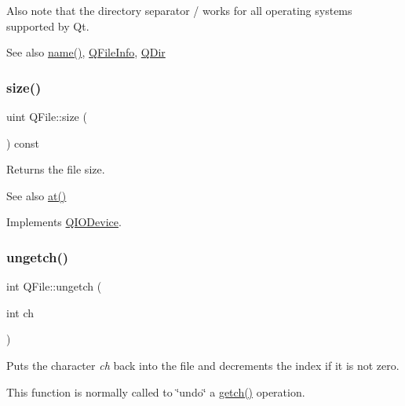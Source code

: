 Also note that the directory separator \textquotesingle{}/\textquotesingle{} works for all operating systems supported by Qt.

\begin{DoxySeeAlso}{See also}
\mbox{\hyperlink{class_q_file_ad14b368c041b9e2d22bbd4428f859b29}{name()}}, \mbox{\hyperlink{class_q_file_info}{Q\+File\+Info}}, \mbox{\hyperlink{class_q_dir}{Q\+Dir}} 
\end{DoxySeeAlso}
\mbox{\label{class_q_file_ae6d2d1ffc423701e6acfc7be48a11e73}} 
\subsubsection{\texorpdfstring{size()}{size()}}
{\footnotesize\ttfamily uint Q\+File\+::size (\begin{DoxyParamCaption}{ }\end{DoxyParamCaption}) const\hspace{0.3cm}{\ttfamily [virtual]}}

Returns the file size. \begin{DoxySeeAlso}{See also}
\mbox{\hyperlink{class_q_file_aa156f3896b35b0c6f6e9cf9237bf34bf}{at()}} 
\end{DoxySeeAlso}


Implements \mbox{\hyperlink{class_q_i_o_device_a60c4146763625213ac7aa29f1f071592}{Q\+I\+O\+Device}}.

\mbox{\label{class_q_file_afb01a04cda09b3cc61babb5d334a052c}} 
\subsubsection{\texorpdfstring{ungetch()}{ungetch()}}
{\footnotesize\ttfamily int Q\+File\+::ungetch (\begin{DoxyParamCaption}\item[{int}]{ch }\end{DoxyParamCaption})\hspace{0.3cm}{\ttfamily [virtual]}}

Puts the character {\itshape ch} back into the file and decrements the index if it is not zero.

This function is normally called to \char`\"{}undo\char`\"{} a \mbox{\hyperlink{class_q_file_a1c18e1a16e6f92ba8f19177824707f78}{getch()}} operation.

